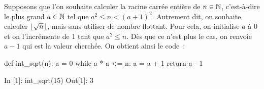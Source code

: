 \documentclass{magnoliaold}
\begin{document}
Supposons que l'on souhaite calculer la racine carrée
entière de $n\in\mathbb{N}$, c'est-à-dire le plus grand $a\in\mathbb{N}$ tel que $a^2 \leq n < (a+1)^2$.
Autrement dit, on souhaite calculer $\left\lfloor\sqrt{n}\right\rfloor$, mais sans utiliser de nombre
flottant. Pour cela, on initialise $a$ à 0 et on l'incrémente de 1 tant que $a^2 \leq n$.
Dès que ce n'est plus le cas, on renvoie $a-1$ qui est la valeur cherchée. On obtient
ainsi le code~:
\begin{pythoncodeline}
def int_sqrt(n):
    a = 0
    while a * a <= n:
        a = a + 1
    return a - 1
\end{pythoncodeline}


\begin{pythoncode}
In [1]: int_sqrt(15)
Out[1]: 3
\end{pythoncode}

\end{document}
